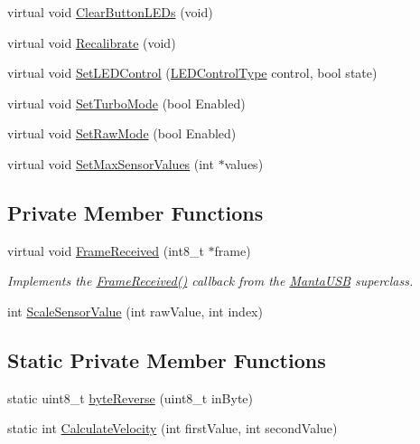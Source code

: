 \begin{DoxyCompactItemize}
\item 
virtual void \hyperlink{classManta_a398d2ad7c1a067c95c8fee72cee34c53}{\-Clear\-Button\-L\-E\-Ds} (void)
\item 
virtual void \hyperlink{classManta_adc8baf40798df6854e7c4860269a266c}{\-Recalibrate} (void)
\item 
virtual void \hyperlink{classManta_ad5d0775822065e7f662aae069cdd8c20}{\-Set\-L\-E\-D\-Control} (\hyperlink{classMantaServer_a4f86e1f91a11c2e3f40765a8166ac1cd}{\-L\-E\-D\-Control\-Type} control, bool state)
\item 
virtual void \hyperlink{classManta_a92f058b946ffde6493788906805c61a4}{\-Set\-Turbo\-Mode} (bool \-Enabled)
\item 
virtual void \hyperlink{classManta_abdf1e1e34a59e1afb6fb674788f64baf}{\-Set\-Raw\-Mode} (bool \-Enabled)
\item 
virtual void \hyperlink{classManta_a3ce1847f6201b5cfe70df249143813ab}{\-Set\-Max\-Sensor\-Values} (int $\ast$values)
\end{DoxyCompactItemize}
\subsection*{\-Private \-Member \-Functions}
\begin{DoxyCompactItemize}
\item 
virtual void \hyperlink{classManta_ae2de440aa98c29ddc39c5870d6936112}{\-Frame\-Received} (int8\-\_\-t $\ast$frame)
\begin{DoxyCompactList}\small\item\em \-Implements the \hyperlink{classManta_ae2de440aa98c29ddc39c5870d6936112}{\-Frame\-Received()} callback from the \hyperlink{classMantaUSB}{\-Manta\-U\-S\-B} superclass. \end{DoxyCompactList}\item 
int \hyperlink{classManta_a12f40ff1118f2caac03b68e113545628}{\-Scale\-Sensor\-Value} (int raw\-Value, int index)
\end{DoxyCompactItemize}
\subsection*{\-Static \-Private \-Member \-Functions}
\begin{DoxyCompactItemize}
\item 
static uint8\-\_\-t \hyperlink{classManta_a8b6496e36a796fac975c872b50c31d16}{byte\-Reverse} (uint8\-\_\-t in\-Byte)
\item 
static int \hyperlink{classManta_af9c0a055915d74f028329b49ff67e1d9}{\-Calculate\-Velocity} (int first\-Value, int second\-Value)
\end{DoxyCompactItemize}
